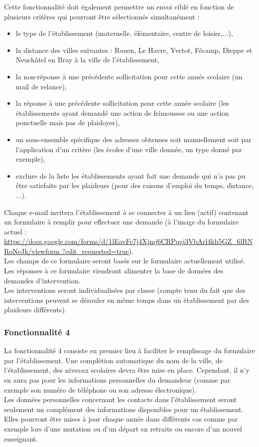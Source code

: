 Cette fonctionnalité doit également permettre un envoi ciblé en fonction de plusieurs critères qui pourront être sélectionnés simultanément :
\begin{itemize}
\item le type de l'établissement (maternelle, élémentaire, centre de loisirs,...), 
\item la distance des villes suivantes : Rouen, Le Havre, Yvetot, Fécamp, Dieppe et Neuchâtel en Bray à la ville de l'établissement,
\item la non-réponse à une précédente sollicitation pour cette année scolaire (un mail de relance),
\item la réponse à une précédente sollicitation pour cette année scolaire (les établissements ayant demandé une action de frimousses ou une action ponctuelle mais pas de plaidoyer),
\item un sous-ensemble spécifique des adresses obtenues soit manuellement soit par l'application d'un critère (les écoles d'une ville donnée, un type donné par exemple),
\item exclure de la liste les établissements ayant fait une demande qui n'a pas pu être satisfaite par les plaideurs (pour des raisons d'emploi du temps, distance, ...). \\
\end{itemize}

Chaque e-mail invitera l'établissement à se connecter à un lien (actif) contenant un formulaire à remplir pour effectuer une demande (à l'image du formulaire actuel :
\url{https://docs.google.com/forms/d/1lEavFc7j4Xjmj6CRPqgi3VbArl4kh5GZ_6lRNRoNeJk/viewform
?edit_requested=true}).
\\
Les champs de ce formulaire seront basés sur le formulaire actuellement utilisé.  Les réponses à ce formulaire viendront alimenter la base de données des demandes d'intervention. \\
Les interventions seront individualisées par classe (compte tenu du fait que des interventions peuvent se dérouler en même temps dans un établissement par des plaideurs différents). 
\\

\subsubsection{Fonctionnalité 4}
La fonctionnalité 4 consiste en premier lieu à faciliter le remplissage du formulaire par l'établissement. 
Une complétion automatique du nom de la ville, de l'établissement, des niveaux scolaires devra être mise en place. Cependant, il n'y en aura pas pour les informations personnelles du demandeur (comme  par exemple son numéro de téléphone ou son adresse électronique).\\
Les données personnelles concernant les contacts dans l'établissement seront seulement un complément des informations disponibles pour un établissement. Elles pourront être mises à jour chaque année dans différents cas comme par exemple lors d'une mutation ou d'un départ en retraite ou encore d'un nouvel enseignant.   \\

